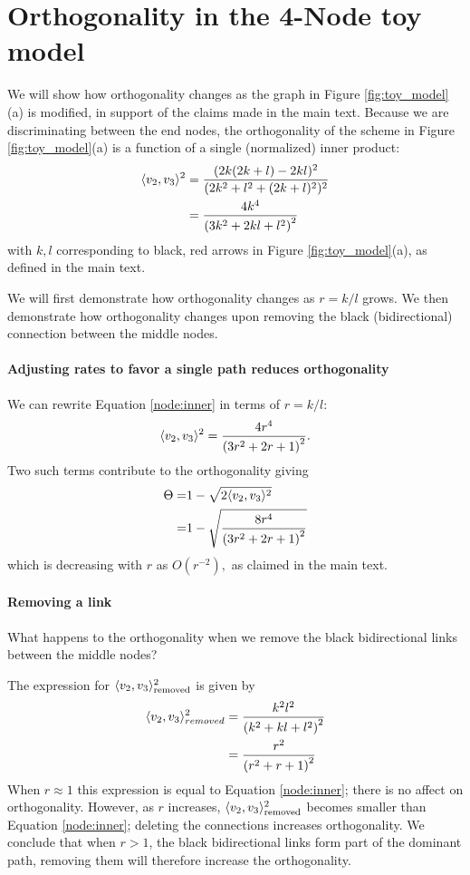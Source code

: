 \section{Orthogonality in the 4-Node toy model}
\label{app:4node}

We will show how orthogonality changes as the graph in Figure \ref{fig:toy_model}(a) is modified, in support of the claims made in the main text.
Because we are discriminating between the end nodes, the orthogonality of the scheme in Figure \ref{fig:toy_model}(a) is a function of a single (normalized) inner product:
\begin{eqnarray*}\label{node:inner}
\langle v_2,v_3\rangle^2 &=\frac{(2k(2k+l)-2kl)^2}{(2k^2+l^2+(2k+l)^2)^2}\\
&=\frac{4 k^4}{\left(3 k^2+2 k l+l^2\right)^2}
\end{eqnarray*}
with $k, l$ corresponding to black, red arrows in Figure \ref{fig:toy_model}(a), as defined in the main text.

We will first demonstrate how orthogonality changes as $r=k/l$ grows.  We then demonstrate how orthogonality changes upon removing the black (bidirectional) connection between the middle nodes.

\paragraph{Adjusting rates to favor a single path reduces orthogonality}
We can rewrite Equation \ref{node:inner} in terms of $r=k/l:$
\[
\langle v_2,v_3\rangle^2 =\frac{4 r^4}{\left(3 r^2+2 r+1\right)^2}.
\]
Two such terms contribute to the orthogonality giving
\begin{eqnarray*}
\Theta = &1-\sqrt{2 \langle v_2,v_3\rangle^2} \\
=&1-\sqrt{\frac{8 r^4}{\left(3 r^2+2 r+1\right)^2}}
\end{eqnarray*}
which is decreasing with $r$ as $O(r^{-2}),$ as claimed in the main text.

\paragraph{Removing a link}
What happens to the orthogonality when we remove the black bidirectional links between the middle nodes?

The expression for $\langle v_2,v_3\rangle^2_{\text{removed}}$ is given by
\[
\begin{aligned}
\langle v_2,v_3\rangle^2_{removed} &=\frac{k^2 l^2}{\left(k^2+k l+l^2\right)^2}\\
&= \frac{r^2}{\left(r^2+r+1\right)^2}
\end{aligned}
\] 
When $r\approx1$ this expression is equal to Equation \ref{node:inner}; there is no affect on orthogonality. However, as $r$ increases, $\langle v_2,v_3\rangle^2_{\text{removed}}$ becomes smaller than Equation \ref{node:inner}; deleting the connections increases orthogonality. 
We conclude that when $r>1$, the black bidirectional links form part of the dominant path, removing them will therefore increase the orthogonality.  
